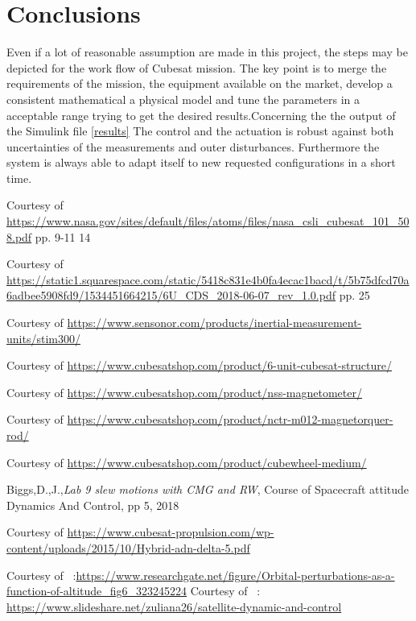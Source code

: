 \documentclass[11pt]{article}
\begin{document}
\section{Conclusions}
Even if a lot of reasonable assumption are made in this project,  the steps may be depicted for the work flow of Cubesat mission. The key point is to merge the requirements of the mission, the equipment available on the market, develop a consistent mathematical a physical model and tune the parameters in a acceptable range trying to get the desired results.Concerning the the output of the Simulink file \ref{results} The control and the actuation is robust against both uncertainties  of the measurements and outer disturbances. Furthermore the system is always able to adapt itself to new requested configurations in a short time. 
\pagebreak
\begin{thebibliography}{}



Courtesy of \url{https://www.nasa.gov/sites/default/files/atoms/files/nasa_csli_cubesat_101_508.pdf} pp. 9-11 14


 

Courtesy of \url{https://static1.squarespace.com/static/5418c831e4b0fa4ecac1bacd/t/5b75dfcd70a6adbee5908fd9/1534451664215/6U_CDS_2018-06-07_rev_1.0.pdf} pp. 25

Courtesy of \url{https://www.sensonor.com/products/inertial-measurement-units/stim300/} 

Courtesy of \url{https://www.cubesatshop.com/product/6-unit-cubesat-structure/} 

Courtesy of \url{https://www.cubesatshop.com/product/nss-magnetometer/} 


Courtesy of \url{https://www.cubesatshop.com/product/nctr-m012-magnetorquer-rod/} 

Courtesy of \url{https://www.cubesatshop.com/product/cubewheel-medium/} 

Biggs,D.,J.,\textit{Lab 9 slew motions with CMG and RW}, Course of Spacecraft attitude Dynamics And Control, pp 5, 2018

Courtesy of \url{https://www.cubesat-propulsion.com/wp-content/uploads/2015/10/Hybrid-adn-delta-5.pdf} 


Courtesy of \ :\url{https://www.researchgate.net/figure/Orbital-perturbations-as-a-function-of-altitude_fig6_323245224}
Courtesy of \ : \url{https://www.slideshare.net/zuliana26/satellite-dynamic-and-control}


\end{thebibliography}
\end{document}
